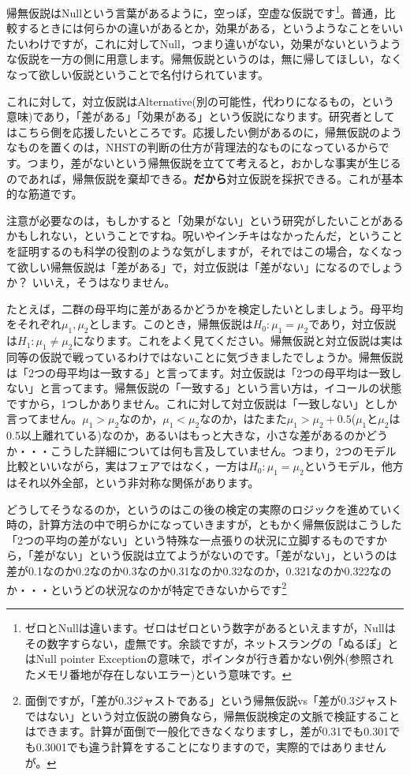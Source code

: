 \documentclass{ltjsbook}
\begin{document}
帰無仮説はNullという言葉があるように，空っぽ，空虚な仮説です\footnote{ゼロとNullは違います。ゼロはゼロという数字があるといえますが，Nullはその数字すらない，虚無です。余談ですが，ネットスラングの「ぬるぽ」とはNull pointer Exceptionの意味で，ポインタが行き着かない例外(参照されたメモリ番地が存在しないエラー)という意味です。}。普通，比較するときには何らかの違いがあるとか，効果がある，というようなことをいいたいわけですが，これに対してNull，つまり違いがない，効果がないというような仮説を一方の側に用意します。帰無仮説というのは，無に帰してほしい，なくなって欲しい仮説ということで名付けられています。

これに対して，対立仮説はAlternative(別の可能性，代わりになるもの，という意味)であり，「差がある」「効果がある」という仮説になります。研究者としてはこちら側を応援したいところです。応援したい側があるのに，帰無仮説のようなものを置くのは，NHSTの判断の仕方が背理法的なものになっているからです。つまり，差がないという帰無仮説を立てて考えると，おかしな事実が生じるのであれば，帰無仮説を棄却できる。\textbf{だから}対立仮説を採択できる。これが基本的な筋道です。

注意が必要なのは，もしかすると「効果がない」という研究がしたいことがあるかもしれない，ということですね。呪いやインチキはなかったんだ，ということを証明するのも科学の役割のような気がしますが，それではこの場合，なくなって欲しい帰無仮説は「差がある」で，対立仮説は「差がない」になるのでしょうか？ いいえ，そうはなりません。

たとえば，二群の母平均に差があるかどうかを検定したいとしましょう。母平均をそれぞれ$\mu_1,\mu_2$とします。このとき，帰無仮説は$H_0 : \mu_1 = \mu_2$であり，対立仮説は$H_1:\mu_1 \neq \mu_2$になります。これをよく見てください。帰無仮説と対立仮説は実は同等の仮説で戦っているわけではないことに気づきましたでしょうか。帰無仮説は「2つの母平均は一致する」と言ってます。対立仮説は「2つの母平均は一致しない」と言ってます。帰無仮説の「一致する」という言い方は，イコールの状態ですから，1つしかありません。これに対して対立仮説は「一致しない」としか言ってません。$\mu_1>\mu_2$なのか，$\mu_1<\mu_2$なのか，はたまた$\mu_1 > \mu_2 + 0.5$($\mu_1$と$\mu_2$は0.5以上離れている)なのか，あるいはもっと大きな，小さな差があるのかどうか・・・こうした詳細については何も言及していません。つまり，2つのモデル比較といいながら，実はフェアではなく，一方は$H_0 : \mu_1 = \mu_2$というモデル，他方はそれ以外全部，という非対称な関係があります。

どうしてそうなるのか，というのはこの後の検定の実際のロジックを進めていく時の，計算方法の中で明らかになっていきますが，ともかく帰無仮説はこうした「2つの平均の差がない」という特殊な一点張りの状況に立脚するものですから，「差がない」という仮説は立てようがないのです。「差がない」，というのは差が0.1なのか0.2なのか0.3なのか0.31なのか0.32なのか，0.321なのか0.322なのか・・・というどの状況なのかが特定できないからです\footnote{面倒ですが，「差が0.3ジャストである」という帰無仮説vs「差が0.3ジャストではない」という対立仮説の勝負なら，帰無仮説検定の文脈で検証することはできます。計算が面倒で一般化できなくなりますし，差が0.31でも0.301でも0.3001でも違う計算をすることになりますので，実際的ではありませんが。}
\end{document}
